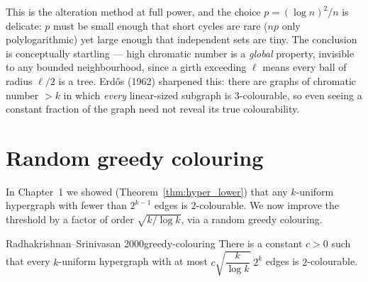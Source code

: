 \begin{insight}
This is the alteration method at full power, and the choice $p=(\log n)^2/n$ is
delicate: $p$ must be small enough that short cycles are rare
($np$ only polylogarithmic) yet large enough that independent sets are tiny.
The conclusion is conceptually startling --- high chromatic number is a
\emph{global} property, invisible to any bounded neighbourhood, since a girth
exceeding $\ell$ means every ball of radius $\ell/2$ is a tree. Erd\H{o}s (1962)
sharpened this: there are graphs of chromatic number $>k$ in which \emph{every}
linear-sized subgraph is $3$-colourable, so even seeing a constant fraction of
the graph need not reveal its true colourability.
\end{insight}

\section{Random greedy colouring}

In Chapter~1 we showed (Theorem~\ref{thm:hyper_lower}) that any $k$-uniform
hypergraph with fewer than $2^{k-1}$ edges is $2$-colourable. We now improve the
threshold by a factor of order $\sqrt{k/\log k}$, via a random greedy colouring.

\begin{theorem}{Radhakrishnan--Srinivasan 2000}{greedy-colouring}
There is a constant $c>0$ such that every $k$-uniform hypergraph with at most
$c\sqrt{\dfrac{k}{\log k}}\;2^{k}$ edges is $2$-colourable.
\end{theorem}

